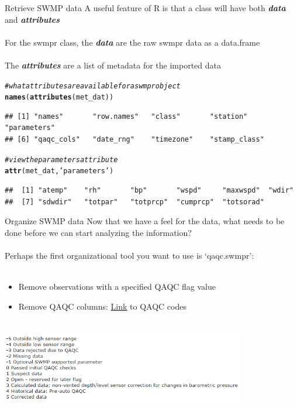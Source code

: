 \documentclass[xcolor=svgnames]{beamer}\usepackage[]{graphicx}\usepackage[]{color}
\makeatletter
\newcommand{\hlstr}[1]{\textcolor[rgb]{0.192,0.494,0.8}{#1}}%
\newcommand{\hlcom}[1]{\textcolor[rgb]{0.678,0.584,0.686}{\textit{#1}}}%
\newcommand{\hlstd}[1]{\textcolor[rgb]{0.345,0.345,0.345}{#1}}%
\newcommand{\hlkwd}[1]{\textcolor[rgb]{0.737,0.353,0.396}{\textbf{#1}}}%
\newenvironment{kframe}{%
 \def\at@end@of@kframe{}%
 \ifinner\ifhmode%
  \def\at@end@of@kframe{\end{minipage}}%
  \begin{minipage}{\columnwidth}%
 \fi\fi%
 \def\FrameCommand##1{\hskip\@totalleftmargin \hskip-\fboxsep
 \colorbox{shadecolor}{##1}\hskip-\fboxsep
     \hskip-\linewidth \hskip-\@totalleftmargin \hskip\columnwidth}%
 \MakeFramed {\advance\hsize-\width
   \@totalleftmargin\z@ \linewidth\hsize
   \@setminipage}}%
 {\par\unskip\endMakeFramed%
 \at@end@of@kframe}
\newenvironment{knitrout}{}{} %
\newcommand{\Bigtxt}[1]{\textbf{\textit{#1}}}
\makeatother
\begin{document}
\begin{frame}{Retrieve SWMP data}
A useful feature of R is that a class will have both \Bigtxt{data} and \Bigtxt{attributes}\\~\\
For the swmpr class, the \Bigtxt{data} are the raw swmpr data as a data.frame \\~\\
The \Bigtxt{attributes} are a list of metadata for the imported data
\begin{knitrout}\scriptsize
{}\color{fgcolor}\begin{kframe}
\begin{alltt}
\hlcom{# what attributes are available for a swmpr object}
\hlkwd{names}\hlstd{(}\hlkwd{attributes}\hlstd{(met_dat))}
\end{alltt}
\begin{verbatim}
## [1] "names"       "row.names"   "class"       "station"     "parameters" 
## [6] "qaqc_cols"   "date_rng"    "timezone"    "stamp_class"
\end{verbatim}
\begin{alltt}
\hlcom{# view the parameters attribute}
\hlkwd{attr}\hlstd{(met_dat,} \hlstr{'parameters'}\hlstd{)}
\end{alltt}
\begin{verbatim}
##  [1] "atemp"    "rh"       "bp"       "wspd"     "maxwspd"  "wdir"    
##  [7] "sdwdir"   "totpar"   "totprcp"  "cumprcp"  "totsorad"
\end{verbatim}
\end{kframe}
\end{knitrout}
\end{frame}

\begin{frame}{Organize SWMP data}
Now that we have a feel for the data, what needs to be done before we can start analyzing the information? \\~\\
Perhaps the first organizational tool you want to use is `qaqc.swmpr':\\~\\
\begin{itemize}
\item Remove observations with a specified QAQC flag value
\item Remove QAQC columns: \href{http://cdmo.baruch.sc.edu/data/qaqc.cfm}{Link} to QAQC codes \\~\\
\end{itemize}
\centerline{\includegraphics[width = 0.8\textwidth]{qaqc_flags.png}}
\end{frame}
\end{document}
